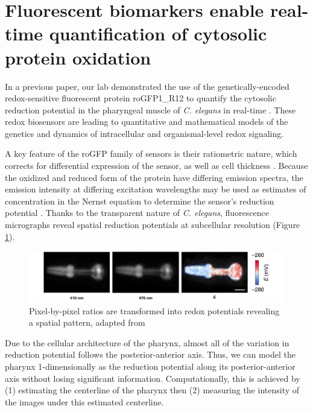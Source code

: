 \section{Fluorescent biomarkers enable real-time quantification of cytosolic protein oxidation} \label{fluorescenceIntro}
In a previous paper, our lab demonstrated the use of the genetically-encoded redox-sensitive fluorescent protein roGFP1\_R12 to quantify the cytosolic reduction potential in the pharyngeal muscle of \textit{C. elegans} in real-time \cite{romero-aristizabal2014}. These redox biosensors are leading to quantitative and mathematical models of the genetics and dynamics of intracellular and organismal-level redox signaling.

A key feature of the roGFP family of sensors is their ratiometric nature, which corrects for differential expression of the sensor, as well as cell thickness \cite{hanson2004}. Because the oxidized and reduced form of the protein have differing emission spectra, the emission intensity at differing excitation wavelengths may be used as estimates of concentration in the Nernst equation to determine the sensor's reduction potential \cite{meyer2010}. Thanks to the transparent nature of \textit{C. elegans}, fluorescence micrographs reveal spatial reduction potentials at subcellular resolution (Figure \ref{fig:ratioImageToE}).

\begin{figure}[ht]
    \centering
    \includegraphics[scale=.25]{Figures/rendered_files/ratios_to_e}
    \decoRule
    \caption[Ratios of images to reduction potential]{Pixel-by-pixel ratios are transformed into redox potentials revealing a spatial pattern, adapted from \cite{romero-aristizabal2014}}
    \label{fig:ratioImageToE}
\end{figure}

Due to the cellular architecture of the pharynx, almost all of the variation in reduction potential follows the posterior-anterior axis. Thus, we can model the pharynx 1-dimensionally as the reduction potential along its posterior-anterior axis without losing significant information. Computationally, this is achieved by (1) estimating the centerline of the pharynx then (2) measuring the intensity of the images under this estimated centerline.

